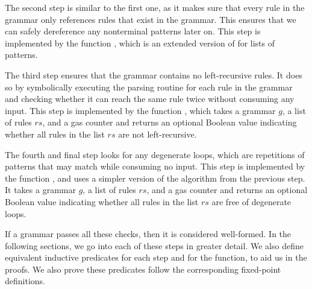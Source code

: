 The second step is similar to the first one,
as it makes sure that every rule in the grammar
only references rules that exist in the grammar.
This ensures that we can safely
dereference any nonterminal patterns later on.
This step is implemented by the function \textit{\lcoherentname{}},
which is an extended version of \textit{\coherentname{}}
for lists of patterns.

The third step
ensures that the grammar contains no
left-recursive rules.
It does so by symbolically executing the parsing routine
for each rule in the grammar
and checking whether it can reach the same rule twice
without consuming any input.
This step is implemented by the function \textit{\lverifyrulename{}},
which takes a grammar $g$, a list of rules $rs$, and a gas counter
and returns an optional Boolean value
indicating whether all rules in the list $rs$
are not left-recursive.

The fourth and final step
looks for any degenerate loops,
which are repetitions of patterns
that may match while consuming no input.
This step is implemented by the function \textit{\lcheckloopsname{}},
and uses a simpler version
of the algorithm from the previous step.
It takes a grammar $g$, a list of rules $rs$, and a gas counter
and returns an optional Boolean value
indicating whether all rules in the list $rs$
are free of degenerate loops.

If a grammar passes all these checks,
then it is considered well-formed.
In the following sections,
we go into each of these steps
in greater detail.
We also define equivalent inductive predicates
for each step and for the \textit{\verifygrammarname{}} function,
to aid us in the proofs.
We also prove these predicates
follow the corresponding fixed-point definitions.





